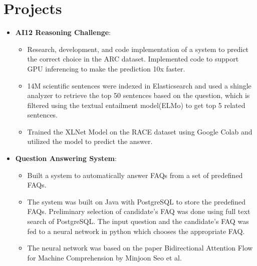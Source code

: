 \documentclass[letterpaper,11pt]{article}
\newcommand{\resumeItem}[2]{
  \item\small{
    \textbf{#1}{: #2 \vspace{-2pt}}
  }
}
\newcommand{\resumeSubHeadingListStart}{\begin{itemize}[leftmargin=*]}
\newcommand{\resumeSubHeadingListEnd}{\end{itemize}}
\newcommand{\resumeItemListStart}{\begin{itemize}}
\newcommand{\resumeItemListEnd}{\end{itemize}\vspace{-5pt}}
\begin{document}
\section{Projects}
    \resumeSubHeadingListStart
        \resumeItem{AI12 Reasoning Challenge}
            {}
            \resumeItemListStart
                \item{Research, development, and code implementation of a system to predict the correct choice in the ARC dataset. Implemented code to support GPU inferencing to make the prediction 10x faster.}
                \item{14M scientific sentences were indexed in Elasticsearch and used a shingle analyzer to retrieve the top 50 sentences based on the question, which is filtered using the textual entailment model(ELMo) to get top 5 related sentences.}
                \item{Trained the XLNet Model on the RACE dataset using Google Colab and utilized the model to predict the answer.}
            \resumeItemListEnd
        \resumeItem{Question Answering System}
            {}
            \resumeItemListStart
                \item{Built a system to automatically answer FAQs from a set of predefined FAQs.}
                \item{The system was built on Java with PostgreSQL to store the predefined FAQs. Preliminary selection of candidate's FAQ was done using full text search of PostgreSQL. The input question and the candidate's FAQ was fed to a neural network in python which chooses the appropriate FAQ.}
                \item{The neural network was based on the paper Bidirectional Attention Flow for Machine Comprehension by Minjoon Seo et al.}
            \resumeItemListEnd
        
    \resumeSubHeadingListEnd
 
\end{document}
